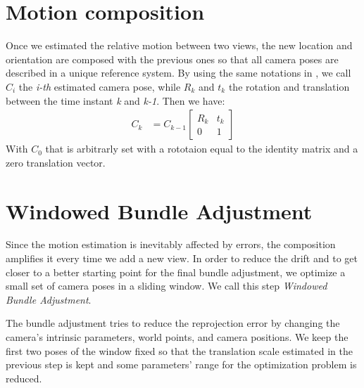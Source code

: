 \section{Motion composition}
Once we estimated the relative motion between two views, the new location and 
orientation are composed with the previous ones so that all camera poses are
described in a unique reference system. By using the same notations in 
\cite{scaramuzzaVisualOdometryI}, we call \( C_i \) the \textit{i-th} 
estimated camera pose, while \( R_k \) and \( t_k \) the rotation and 
translation between the time instant \textit{k} and \textit{k-1}. Then we have:
\begin{align}
	C_k &= C_{k-1}
	\begin{bmatrix}
		R_k & t_k \\
		0 & 1
	\end{bmatrix}
\end{align}
With \( C_0 \) that is arbitrarly set with a rototaion equal to the identity
matrix and a zero translation vector.

\section{Windowed Bundle Adjustment}
Since the motion estimation is inevitably affected by errors,  
the composition amplifies it every time we add a new
view. In order to reduce the drift and to get closer to a better starting point 
for the final bundle adjustment, we optimize a small set of camera poses in 
a sliding window. We call this step \textit{Windowed Bundle Adjustment}.

The bundle adjustment tries to reduce the reprojection error by changing the
camera's intrinsic parameters, world points, and camera positions. 
We keep the first two poses of the window fixed so that the translation scale 
estimated in the previous step is kept and some parameters' range for the 
optimization problem is reduced.
